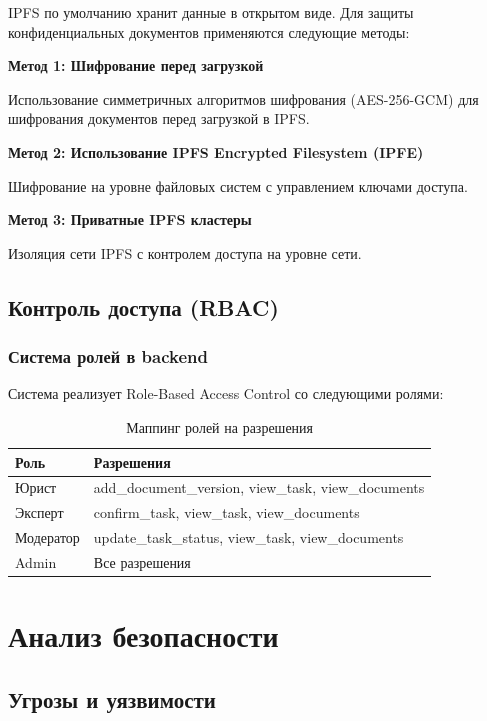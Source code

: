 \documentclass[a4paper,14pt]{extreport}
\begin{document}
IPFS по умолчанию хранит данные в открытом виде. Для защиты конфиденциальных документов применяются следующие методы:

\textbf{Метод 1: Шифрование перед загрузкой}

Использование симметричных алгоритмов шифрования (AES-256-GCM) для шифрования документов перед загрузкой в IPFS.

\textbf{Метод 2: Использование IPFS Encrypted Filesystem (IPFE)}

Шифрование на уровне файловых систем с управлением ключами доступа.

\textbf{Метод 3: Приватные IPFS кластеры}

Изоляция сети IPFS с контролем доступа на уровне сети.

\section{Контроль доступа (RBAC)}

\subsection{Система ролей в backend}

Система реализует Role-Based Access Control со следующими ролями:

\begin{table}[H]
\centering
\caption{Маппинг ролей на разрешения}
\label{tab:roles}
\begin{tabular}{|l|l|}
\hline
\textbf{Роль} & \textbf{Разрешения} \\
\hline
Юрист & add\_document\_version, view\_task, view\_documents \\
Эксперт & confirm\_task, view\_task, view\_documents \\
Модератор & update\_task\_status, view\_task, view\_documents \\
Admin & Все разрешения \\
\hline
\end{tabular}
\end{table}

\newpage

\chapter{Анализ безопасности}

\section{Угрозы и уязвимости}
\end{document}
